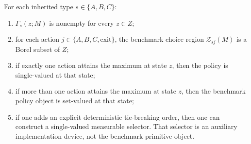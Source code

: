 \begin{proposition}
For each inherited type $s\in\{A,B,C\}$:
\begin{enumerate}
    \item $\Gamma_s(z;M)$ is nonempty for every $z\in Z$;
    \item for each action $j\in\{A,B,C,\mathrm{exit}\}$, the benchmark choice region $\mathcal Z_{sj}(M)$ is a Borel subset of $Z$;
    \item if exactly one action attains the maximum at state $z$, then the policy is single-valued at that state;
    \item if more than one action attains the maximum at state $z$, then the benchmark policy object is set-valued at that state;
    \item if one adds an explicit deterministic tie-breaking order, then one can construct a single-valued measurable selector. That selector is an auxiliary implementation device, not the benchmark primitive object.
\end{enumerate}
\end{proposition}

